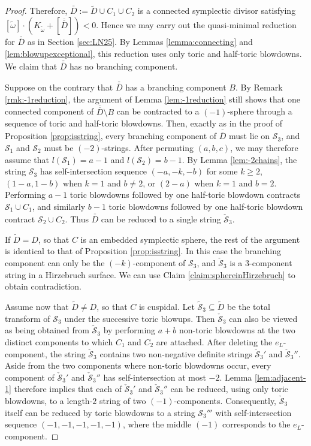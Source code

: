 \documentclass[11pt]{article}
\theoremstyle{definition}
\theoremstyle{remark}
\newcommand{\st}{\mathcal{S}}
\begin{document}
\begin{proof}
Therefore, $\overline{\overline{D}}:=\tilde{D}\cup C_1\cup C_2$ is a connected symplectic divisor satisfying $[\tilde{\omega}]\cdot(K_{\tilde{\omega}}+[\overline{\overline{D}}])<0$. Hence we may carry out the quasi-minimal reduction for $\overline{\overline{D}}$ as in Section \ref{sec:LN25}. By Lemmas \ref{lemma:connecting} and \ref{lem:blowupexceptional}, this reduction uses only toric and half-toric blowdowns. We claim that $\overline{\overline{D}}$ has no branching component.

Suppose on the contrary that $\overline{\overline{D}}$ has a branching component $B$. By Remark \ref{rmk:-1reduction}, the argument of Lemma \ref{lem:-1reduction} still shows that one connected component of $\overline{\overline{D}}\setminus B$ can be contracted to a $(-1)$-sphere through a sequence of toric and half-toric blowdowns. Then, exactly as in the proof of Proposition \ref{prop:isstring}, every branching component of $\overline{\overline{D}}$ must lie on $\st_3$, and $\st_1$ and $\st_2$ must be $(-2)$-strings. After permuting $(a,b,c)$, we may therefore assume that $l(\st_1)=a-1$ and $l(\st_2)=b-1$. By Lemma \ref{lem:-2chains}, the string $\st_3$ has self-intersection sequence $(-a,-k,-b)$ for some $k\ge 2$, $(1-a,1-b)$ when $k=1$ and $b\neq 2$, or $(2-a)$ when $k=1$ and $b=2$. Performing $a-1$ toric blowdowns followed by one half-toric blowdown contracts $\st_1\cup C_1$, and similarly $b-1$ toric blowdowns followed by one half-toric blowdown contract $\st_2\cup C_2$. Thus $\overline{\overline{D}}$ can be reduced to a single string $\check{\st}_3$.

If $\tilde{D}=D$, so that $C$ is an embedded symplectic sphere, the rest of the argument is identical to that of Proposition \ref{prop:isstring}. In this case the branching component can only be the $(-k)$-component of $\st_3$, and $\check{\st}_3$ is a $3$-component string in a Hirzebruch surface. We can use Claim \ref{claim:sphereinHirzebruch} to obtain contradiction.

Assume now that $\tilde{D}\neq D$, so that $C$ is cuspidal. Let $\tilde{\st}_3\subseteq \tilde{D}$ be the total transform of $\st_3$ under the successive toric blowups. Then $\check{\st}_3$ can also be viewed as being obtained from $\tilde{\st}_3$ by performing $a+b$ non-toric blowdowns at the two distinct components to which $C_1$ and $C_2$ are attached. After deleting the $e_L$-component, the string $\check{\st}_3$ contains two non-negative definite strings $\check{\st}_3'$ and $\check{\st}_3''$. Aside from the two components where non-toric blowdowns occur, every component of $\check{\st}_3'$ and $\check{\st}_3''$ has self-intersection at most $-2$. Lemma \ref{lem:adjacent-1} therefore implies that each of $\check{\st}_3'$ and $\check{\st}_3''$ can be reduced, using only toric blowdowns, to a length-$2$ string of two $(-1)$-components. Consequently, $\check{\st}_3$ itself can be reduced by toric blowdowns to a string $\st_3'''$ with self-intersection sequence $(-1,-1,-1,-1,-1)$, where the middle $(-1)$ corresponds to the $e_L$-component.


\end{proof}
\end{document}
